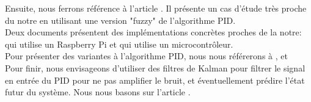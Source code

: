 \documentclass[a4paper,10pt]{article}
\begin{document}
Ensuite, nous ferrons référence à l'article  \cite{Zheying2014}. Il présente un cas d'étude très proche du notre en utilisant une version "fuzzy" de l'algorithme PID.\\

Deux documents présentent des implémentations concrètes proches de la notre:  \cite{Ioannidis2014} qui utilise un Raspberry Pi et  \cite{ATMEL2005} qui utilise un microcontrôleur. \\

Pour présenter des variantes à l'algorithme PID, nous nous référerons à  \cite{Afou2014},  \cite{ballard1993pid} et  \cite{Saletovi2014} \\

Pour finir, nous envisageons d'utiliser des filtres de Kalman pour filtrer le signal en entrée du PID pour ne pas amplifier le bruit, et éventuellement prédire l'état futur du système. Nous nous basons sur l'article  \cite{Welch2006}.

\newpage

\printbibliography
\end{document}
